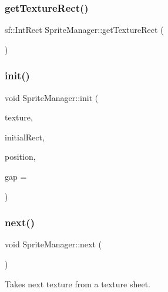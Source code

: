 \mbox{\label{class_sprite_manager_af51994d0f3a5e847a8c55bb022f8b1e2}} 
\subsubsection{\texorpdfstring{getTextureRect()}{getTextureRect()}}
{\footnotesize\ttfamily sf\+::\+Int\+Rect Sprite\+Manager\+::get\+Texture\+Rect (\begin{DoxyParamCaption}{ }\end{DoxyParamCaption})\hspace{0.3cm}{\ttfamily [inline]}}

\mbox{\label{class_sprite_manager_a6bc9f6b77d54099de6fcf84ec1e360bd}} 
\subsubsection{\texorpdfstring{init()}{init()}}
{\footnotesize\ttfamily void Sprite\+Manager\+::init (\begin{DoxyParamCaption}\item[{sf\+::\+Texture $\ast$}]{texture,  }\item[{const sf\+::\+Int\+Rect \&}]{initial\+Rect,  }\item[{const sf\+::\+Vector2f \&}]{position,  }\item[{int}]{gap = {} }\end{DoxyParamCaption})}

\mbox{\label{class_sprite_manager_acdcd181f96ed049db0bf445a71e4b6e2}} 
\subsubsection{\texorpdfstring{next()}{next()}}
{\footnotesize\ttfamily void Sprite\+Manager\+::next (\begin{DoxyParamCaption}{ }\end{DoxyParamCaption})}



Takes next texture from a texture sheet. 

